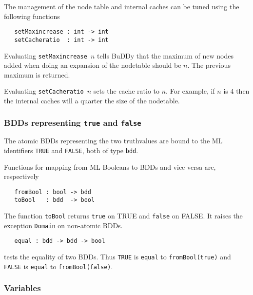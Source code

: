 \documentclass[12pt]{book}
\renewcommand{\t}[1]{\mbox{\tt #1}}
\newcommand{\Buddy}{BuDDy{}}
\begin{document}
\medskip

The management of the node table and internal caches can be tuned
using the following functions


\begin{verbatim}
   setMaxincrease : int -> int
   setCacheratio  : int -> int
\end{verbatim}

Evaluating \t{setMaxincrease~$n$} tells \Buddy{} that the maximum of new nodes added
when doing an expansion of the nodetable should be $n$.  The previous maximum is returned.

Evaluating \t{setCacheratio~$n$} sets the cache ratio to $n$.  
For example, if $n$ is $4$ then the internal caches will a quarter the size of the
nodetable.

\subsubsection{BDDs representing {\t{true}} and {\t{false}}}

The atomic BDDs representing the two truthvalues are bound to the ML
identifiers \t{TRUE} and \t{FALSE}, both of type \t{bdd}.

Functions for mapping from ML Booleans to BDDs and vice versa are, respectively

\begin{verbatim}
   fromBool : bool -> bdd
   toBool   : bdd  -> bool
\end{verbatim}

The function \t{toBool} returns \t{true} on TRUE and \t{false} on FALSE.
It raises the exception \t{Domain} on non-atomic BDDs.

\begin{verbatim}
   equal : bdd -> bdd -> bool
\end{verbatim}

tests the equality of two BDDs. Thus \t{TRUE} is \t{equal} to \t{fromBool(true)} and 
\t{FALSE} is \t{equal} to \t{fromBool(false)}.

\subsubsection{Variables}
\end{document}

